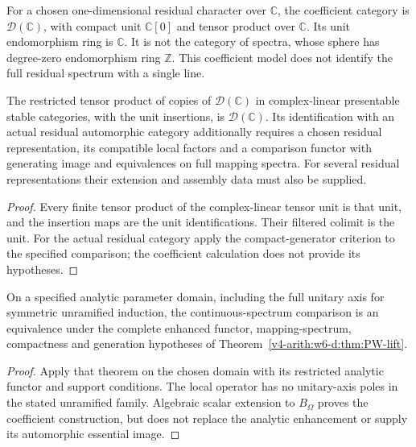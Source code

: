 \begin{definition}
\label{v4-arith:w6-d:def:C-res-local}
For a chosen one-dimensional residual character over $\mathbb C$,
the coefficient category is $\mathcal D(\mathbb C)$, with compact
unit $\mathbb C[0]$ and tensor product over $\mathbb C$.
Its unit endomorphism ring is $\mathbb C$. It is not the category
of spectra, whose sphere has degree-zero endomorphism ring $\mathbb Z$.
This coefficient model does not identify the full residual spectrum
with a single line.
\end{definition}
\begin{theorem}
\label{v4-arith:w6-d:thm:res-lift}
The restricted tensor product of copies of $\mathcal D(\mathbb C)$
in complex-linear presentable stable categories, with the unit
insertions, is $\mathcal D(\mathbb C)$. Its identification with an
actual residual automorphic category additionally requires a chosen
residual representation, its compatible local factors and a comparison
functor with generating image and equivalences on full mapping spectra.
For several residual representations their extension and assembly data
must also be supplied.
\end{theorem}
\begin{proof}
Every finite tensor product of the complex-linear tensor unit is
that unit, and the insertion maps are the unit identifications. Their
filtered colimit is the unit. For the actual residual category apply
the compact-generator criterion to the specified comparison; the
coefficient calculation does not provide its hypotheses.
\end{proof}

\begin{theorem}
\label{v4-arith:w6-d:thm:cont-lift}
On a specified analytic parameter domain, including the full unitary
axis for symmetric unramified induction, the continuous-spectrum
comparison is an equivalence under the complete enhanced functor,
mapping-spectrum, compactness and generation hypotheses of
Theorem~\ref{v4-arith:w6-d:thm:PW-lift}.
\end{theorem}
\begin{proof}
Apply that theorem on the chosen domain with its restricted analytic
functor and support conditions. The local operator has no unitary-axis
poles in the stated unramified family. Algebraic scalar extension to
$B_\Omega$ proves the coefficient construction, but does not replace
the analytic enhancement or supply its automorphic essential image.
\end{proof}

